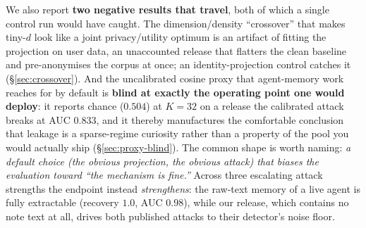 \documentclass[pdflatex,sn-mathphys-num,12pt]{sn-jnl}
\theoremstyle{thmstyleone}%
\theoremstyle{thmstyletwo}%
\theoremstyle{thmstylethree}%
\newcommand{\secref}[1]{\S\ref{#1}}
\begin{document}
We also report \textbf{two negative results that travel}, both of which a single control run would
have caught. The dimension/density
``crossover'' that makes tiny-$d$ look like a joint privacy/utility optimum is an artifact of fitting
the projection on user data, an unaccounted release that flatters the clean baseline and
pre-anonymises the corpus at once; an identity-projection control catches it
(\secref{sec:crossover}). And the uncalibrated cosine proxy that agent-memory work reaches for by
default is \textbf{blind at exactly the operating point one would deploy}: it reports chance
($0.504$) at $K = 32$ on a release the calibrated attack breaks at AUC $0.833$, and it thereby
manufactures the comfortable conclusion that leakage is a sparse-regime curiosity rather than a
property of the pool you would actually ship (\secref{sec:proxy-blind}). The common shape is worth
naming: \emph{a default choice (the obvious projection, the obvious attack) that biases the
evaluation toward ``the mechanism is fine.''} Across three escalating attack strengths the endpoint
instead \emph{strengthens}: the raw-text memory of a live agent is fully extractable (recovery $1.0$,
AUC $0.98$), while our release, which contains no note text at all, drives both published attacks to
their detector's noise floor.
\end{document}
